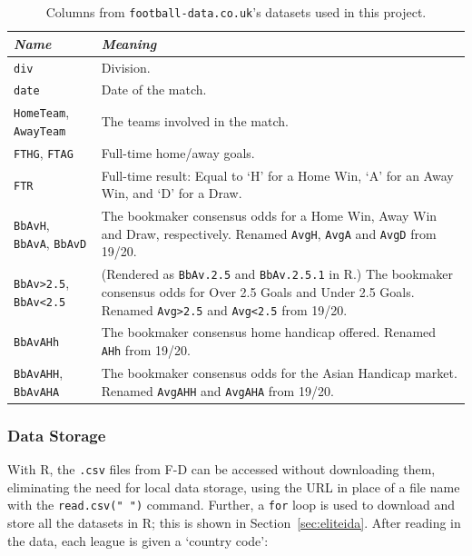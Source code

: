 \documentclass[a4paper,10pt]{report}
\begin{document}
\begin{table}[h!]\begin{center}\begin{tabular}[h!]{p{}|p{}}
\emph{Name} & \emph{Meaning} \\\hline
\lstinline|div| & Division.\\
\lstinline|date| & Date of the match.\\
\lstinline|HomeTeam|, \lstinline|AwayTeam| & The teams involved in the match.\\
\lstinline|FTHG|, \lstinline|FTAG| & Full-time home/away goals.\\
\lstinline|FTR| & Full-time result: Equal to `H' for a Home Win, `A' for an Away Win, and `D' for a Draw.\\
\lstinline|BbAvH|, \lstinline|BbAvA|, \lstinline|BbAvD|&The bookmaker consensus odds for a Home Win, Away Win and Draw, respectively. Renamed \lstinline|AvgH|, \lstinline|AvgA| and \texttt{AvgD} from 19/20.\\
\lstinline|BbAv>2.5|, \lstinline|BbAv<2.5| & (Rendered as \lstinline|BbAv.2.5| and \lstinline|BbAv.2.5.1| in R.) The bookmaker consensus odds for Over 2.5 Goals and Under 2.5 Goals. Renamed \lstinline|Avg>2.5| and \lstinline|Avg<2.5| from 19/20.\\
\lstinline|BbAvAHh| & The bookmaker consensus home handicap offered. Renamed \lstinline|AHh| from 19/20.\\
\lstinline|BbAvAHH|, \lstinline|BbAvAHA| & The bookmaker consensus odds for the Asian Handicap market. Renamed \lstinline|AvgAHH| and \lstinline|AvgAHA| from 19/20.
\end{tabular}\end{center}\caption{Columns from \lstinline|football-data.co.uk|'s datasets used in this project.}\label{tab:footballdatacols}\end{table}

\subsubsection{Data Storage}\label{sssec:intromethoddatastorage}
With R, the \lstinline|.csv| files from F-D can be accessed without downloading them, eliminating the need for local data storage, using the URL in place of a file name with the \lstinline|read.csv(" ")| command. Further, a \lstinline|for| loop is used to download and store all the datasets in R; this is shown in Section~\ref{sec:eliteida}. After reading in the data, each league is given a `country code':
\end{document}
